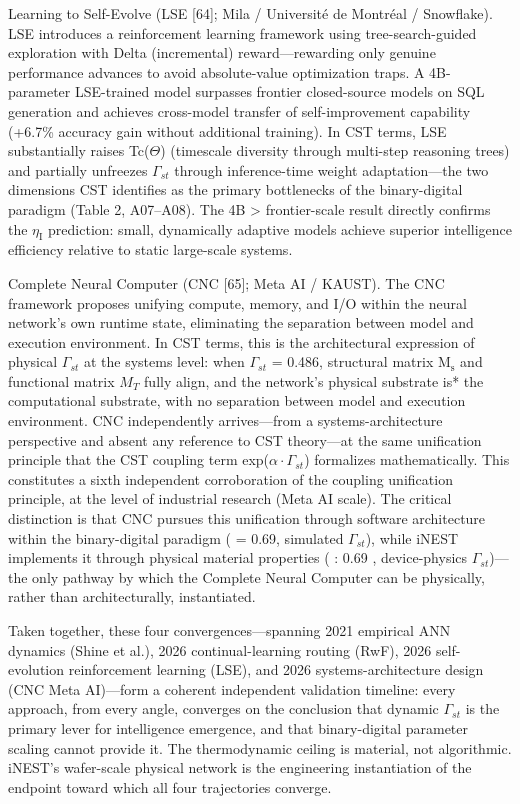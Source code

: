 \documentclass[a4paper,12pt]{article}
\providecommand{\textsubscript}[1]{\ensuremath{_{\text{#1}}}}
\begin{document}
Learning to Self-Evolve (LSE [64]; Mila / Universit\'e de Montr\'eal / Snowflake).
LSE introduces a reinforcement learning framework using tree-search-guided exploration with Delta (incremental) reward---rewarding only genuine performance advances to avoid absolute-value optimization traps.
A 4B-parameter LSE-trained model surpasses frontier closed-source models on SQL generation and achieves cross-model transfer of self-improvement capability (+6.7\% accuracy gain without additional training).
In CST terms, LSE substantially raises Tc($\Theta$) (timescale diversity through multi-step reasoning trees) and partially unfreezes $\Gamma_{st}$ through inference-time weight adaptation---the two dimensions CST identifies as the primary bottlenecks of the binary-digital paradigm (Table 2, A07--A08).
The 4B > frontier-scale result directly confirms the $\eta_{\text{I}}$ prediction: small, dynamically adaptive models achieve superior intelligence efficiency relative to static large-scale systems.

Complete Neural Computer (CNC [65]; Meta AI / KAUST).
The CNC framework proposes unifying compute, memory, and I/O within the neural network's own runtime state, eliminating the separation between model and execution environment.
In CST terms, this is the architectural expression of physical $\Gamma_{st}$ at the systems level: when $\Gamma_{st}$  \rightarrow   \gamma  = 0.486, structural matrix M\textsubscript{s} and functional matrix $M_{T}$ fully align, and the network's physical substrate is* the computational substrate, with no separation between model and execution environment.
CNC independently arrives---from a systems-architecture perspective and absent any reference to CST theory---at the same unification principle that the CST coupling term exp($\alpha \cdot \Gamma_{st}$) formalizes mathematically.
This constitutes a sixth independent corroboration of the coupling unification principle, at the level of industrial research (Meta AI scale).
The critical distinction is that CNC pursues this unification through software architecture within the binary-digital paradigm ( \alpha  = 0.69, simulated $\Gamma_{st}$), while iNEST implements it through physical material properties ( \alpha : 0.69 , device-physics $\Gamma_{st}$)---the only pathway by which the Complete Neural Computer can be physically, rather than architecturally, instantiated.

Taken together, these four convergences---spanning 2021 empirical ANN dynamics (Shine et al.), 2026 continual-learning routing (RwF), 2026 self-evolution reinforcement learning (LSE), and 2026 systems-architecture design (CNC Meta AI)---form a coherent independent validation timeline: every approach, from every angle, converges on the conclusion that dynamic $\Gamma_{st}$ is the primary lever for intelligence emergence, and that binary-digital parameter scaling cannot provide it.
The thermodynamic ceiling is material, not algorithmic. iNEST's wafer-scale physical network is the engineering instantiation of the endpoint toward which all four trajectories converge.
\end{document}
